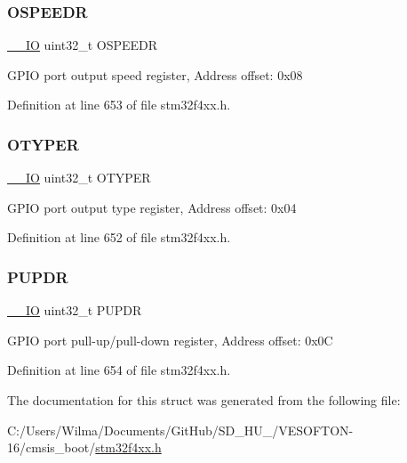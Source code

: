 \subsubsection{\texorpdfstring{O\+S\+P\+E\+E\+DR}{OSPEEDR}}
{\footnotesize\ttfamily \hyperlink{group___c_m_s_i_s__core__definitions_gaec43007d9998a0a0e01faede4133d6be}{\+\_\+\+\_\+\+IO} uint32\+\_\+t O\+S\+P\+E\+E\+DR}

G\+P\+IO port output speed register, Address offset\+: 0x08 

Definition at line 653 of file stm32f4xx.\+h.

\mbox{\label{struct_g_p_i_o___type_def_a9543592bda60cb5261075594bdeedac9}} 
\subsubsection{\texorpdfstring{O\+T\+Y\+P\+ER}{OTYPER}}
{\footnotesize\ttfamily \hyperlink{group___c_m_s_i_s__core__definitions_gaec43007d9998a0a0e01faede4133d6be}{\+\_\+\+\_\+\+IO} uint32\+\_\+t O\+T\+Y\+P\+ER}

G\+P\+IO port output type register, Address offset\+: 0x04 

Definition at line 652 of file stm32f4xx.\+h.

\mbox{\label{struct_g_p_i_o___type_def_abeed38529bd7b8de082e490e5d4f1727}} 
\subsubsection{\texorpdfstring{P\+U\+P\+DR}{PUPDR}}
{\footnotesize\ttfamily \hyperlink{group___c_m_s_i_s__core__definitions_gaec43007d9998a0a0e01faede4133d6be}{\+\_\+\+\_\+\+IO} uint32\+\_\+t P\+U\+P\+DR}

G\+P\+IO port pull-\/up/pull-\/down register, Address offset\+: 0x0C 

Definition at line 654 of file stm32f4xx.\+h.



The documentation for this struct was generated from the following file\+:\begin{DoxyCompactItemize}
\item 
C\+:/\+Users/\+Wilma/\+Documents/\+Git\+Hub/\+S\+D\+\_\+\+H\+U\+\_/\+V\+E\+S\+O\+F\+T\+O\+N-\/16/cmsis\+\_\+boot/\hyperlink{stm32f4xx_8h}{stm32f4xx.\+h}\end{DoxyCompactItemize}
